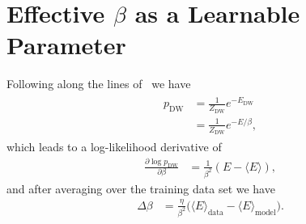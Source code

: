 \section{Effective \( \beta \) as a Learnable Parameter}\label{app:learning_beta}
Following along the lines of~\cite{xu_2021} we have
\begin{align}
\begin{split}
    p_\text{DW}
        &= \frac{1}{Z_\text{DW}} e^{-E_\text{DW}} \\
        &= \frac{1}{Z_\text{DW}} e^{-E / \beta},
\end{split}
\end{align}
which leads to a log-likelihood derivative of
\begin{align}
    \frac{\partial \log p_\text{DW}}{\partial\beta}
        &= \frac{1}{\beta^2} (E - \langle E \rangle),
\end{align}
and after averaging over the training data set we have
\begin{align}
    \Delta\beta
        &= \frac{\eta}{\beta^2}\big(\langle E \rangle_\text{data} - \langle E \rangle_\text{model}\big).
\end{align}

